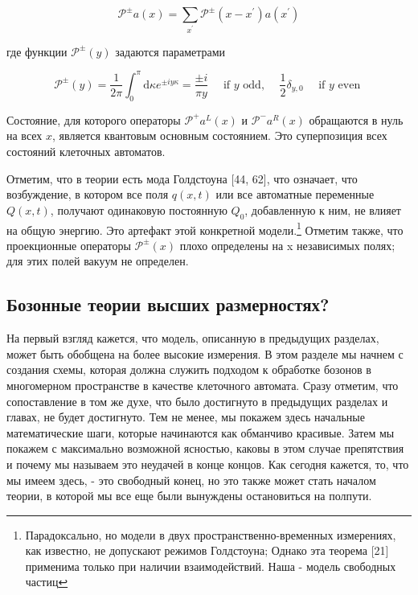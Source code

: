 \documentclass[main.tex]{subfiles}
\begin{document}
\begin{equation}\label{17.65}
	\mathcal{P}^{\pm} a(x)=\sum_{x^{\prime}} \mathcal{P}^{\pm}\left(x-x^{\prime}\right) a\left(x^{\prime}\right)
\end{equation}

где функции $\mathcal{P}^{\pm}(y)$ задаются параметрами

\begin{equation}\label{17.66}
	\mathcal{P}^{\pm}(y)=\frac{1}{2 \pi} \int_{0}^{\pi} \mathrm{d} \kappa e^{\pm i y \kappa}=\frac{\pm i}{\pi y} \quad \text { if } y \text { odd, } \quad \frac{1}{2} \delta_{y, 0} \quad \text { if } y \text { even }
\end{equation}

Состояние, для которого операторы $\mathcal{P}^{+}a^L(x)$ и $\mathcal{P}^{-}a^R(x)$ обращаются в нуль на всех $x$, является квантовым основным состоянием. Это суперпозиция всех состояний клеточных автоматов.

Отметим, что в теории есть мода Голдстоуна [44, 62], что означает, что возбуждение, в котором все поля $q (x, t)$ или все автоматные переменные $Q (x, t)$, получают одинаковую постоянную $Q_0$, добавленную к ним, не влияет на общую энергию. Это артефакт этой конкретной модели.\footnote{Парадоксально, но модели в двух пространственно-временных измерениях, как известно, не допускают режимов Голдстоуна; Однако эта теорема [21] применима только при наличии взаимодействий. Наша - модель свободных частиц} Отметим также, что проекционные операторы $\mathcal{P}^{\pm}(x)$ плохо определены на x независимых полях; для этих полей вакуум не определен.


\subsection{Бозонные теории высших размерностях?}\label{ch17.2}

На первый взгляд кажется, что модель, описанную в предыдущих разделах, может быть обобщена на более высокие измерения. В этом разделе мы начнем с создания схемы, которая должна служить подходом к обработке бозонов в многомерном пространстве в качестве клеточного автомата. Сразу отметим, что сопоставление в том же духе, что было достигнуто в предыдущих разделах и главах, не будет достигнуто. Тем не менее, мы покажем здесь начальные математические шаги, которые начинаются как обманчиво красивые. Затем мы покажем с максимально возможной ясностью, каковы в этом случае препятствия и почему мы называем это неудачей в конце концов. Как сегодня кажется, то, что мы имеем здесь, - это свободный конец, но это также может стать началом теории, в которой мы все еще были вынуждены остановиться на полпути.
\end{document}
